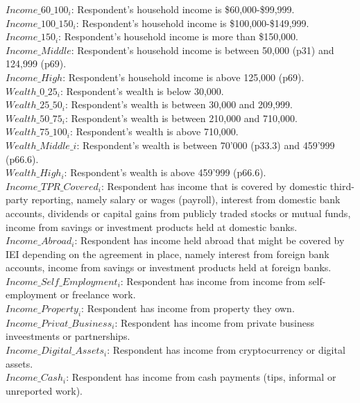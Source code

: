 \documentclass[11pt]{article}
\begin{document}
$Income\_60\_100_i$: Respondent's household income is \$60,000-\$99,999. \\[0.15em]
$Income\_100\_150_i$: Respondent's household income is \$100,000-\$149,999. \\[0.15em]
$Income\_150_i$: Respondent's household income is more than \$150,000. \\[0.15em]
$Income\_Middle$: Respondent's household income is between 50,000 (p31) and 124,999 (p69). \\[0.15em]
$Income\_High$: Respondent's household income is above 125,000 (p69). \\[0.15em]
$Wealth\_0\_25_i$: Respondent's wealth is below 30,000.\\[0.15em]
$Wealth\_25\_50_i$: Respondent's wealth is between 30,000 and 209,999.\\[0.15em]
$Wealth\_50\_75_i$: Respondent's wealth is between 210,000 and 710,000.\\[0.15em]
$Wealth\_75\_100_i$: Respondent's wealth is above 710,000.\\[0.15em]
$Wealth\_Middle\_i$: Respondent's wealth is between 70'000 (p33.3) and 459'999 (p66.6). \\[0.15em]
$Wealth\_High_i$: Respondent's wealth is above 459'999 (p66.6). \\[0.15em]
$Income\_TPR\_Covered_i$: Respondent has income that is covered by domestic third-party reporting, namely salary or wages (payroll), interest from domestic bank accounts, dividends or capital gains from publicly traded stocks or mutual funds, income from savings or investment products held at domestic banks. \\[0.15em]
$Income\_Abroad_i$: Respondent has income held abroad that might be covered by IEI depending on the agreement in place, namely interest from foreign bank accounts, income from savings or investment products held at foreign banks. \\[0.15em]
$Income\_Self\_Employment_i$: Respondent has income from income from self-employment or freelance work. \\[0.15em]
$Income\_Property_i$: Respondent has income from property they own. \\[0.15em]
$Income\_Privat\_Business_i$: Respondent has income from private business inveestments or partnerships. \\[0.15em]
$Income\_Digital\_Assets_i$: Respondent has income from cryptocurrency or digital assets. \\[0.15em]
$Income\_Cash_i$: Respondent has income from cash payments (tips, informal or unreported work). \\[0.15em]
\end{document}
